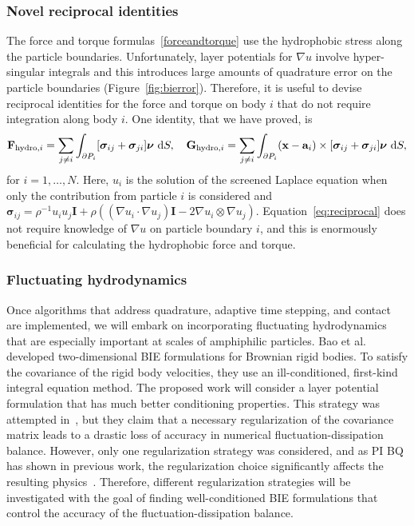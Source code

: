 \subsubsection{Novel reciprocal identities}
\label{subsec:reciprocal}
The force and torque formulas~\eqref{forceandtorque} use the
hydrophobic stress along the particle boundaries. Unfortunately,
layer potentials for $\nabla u$ involve hyper-singular integrals and
this introduces large amounts of quadrature error on the particle
boundaries (Figure~\ref{fig:bierror}). Therefore, it is useful to devise
reciprocal identities for the force and torque on body $i$ that do not
require integration along body $i$. One identity, that we have proved,
is
\begin{align}
    \label{eq:reciprocal}
{\bf F}_{\text{hydro},i} = \sum_{j \neq i} \int_{\partial P_i}[\boldsymbol{\sigma}_{ij} + \boldsymbol{\sigma}_{ji}]\boldsymbol{\nu}\,\dif S,\quad
{\bf G}_{\text{hydro},i} = \sum_{j \neq i} \int_{\partial P_i} ({\bf
  x}-\mathbf{a}_i) \times [\boldsymbol{\sigma}_{ij} +
  \boldsymbol{\sigma}_{ji}]\boldsymbol{\nu}\,\dif S, 
\end{align}
for $i=1,\ldots,N$. Here, $u_i$ is the solution of the screened Laplace
equation when only the contribution from particle $i$ is considered and
$\boldsymbol{\sigma}_{ij} = \rho^{-1} u_iu_j \mathbf{I} +
\rho\left((\nabla u_i \cdot \nabla u_j) \mathbf{I} - 2 \nabla u_i
\otimes \nabla u_j\right)$. Equation~\eqref{eq:reciprocal} does not
require knowledge of $\nabla u$ on particle boundary $i$, and this is
enormously beneficial for calculating the hydrophobic force and torque.

\subsubsection{Fluctuating hydrodynamics}
\label{subsec:fluctuating}
Once algorithms that address quadrature, adaptive time stepping, and
contact are implemented, we will embark on incorporating fluctuating
hydrodynamics that are especially important at scales of amphiphilic
particles. Bao et al.~\cite{Bao17,Bao18} developed two-dimensional BIE
formulations for Brownian rigid bodies. To satisfy the covariance of the
rigid body velocities, they use an ill-conditioned, first-kind integral
equation method. The proposed work will consider a layer potential
formulation that has much better conditioning properties. This strategy
was attempted in~\cite{Bao18}, but they claim that a necessary
regularization of the covariance matrix leads to a drastic loss of
accuracy in numerical fluctuation-dissipation balance. However, only one
regularization strategy was considered, and as PI BQ has shown in
previous work, the regularization choice significantly affects the
resulting physics~\cite{ong-chr-qua2017}. Therefore, different
regularization strategies will be investigated with the goal of finding
well-conditioned BIE formulations that control the accuracy of the
fluctuation-dissipation balance.


